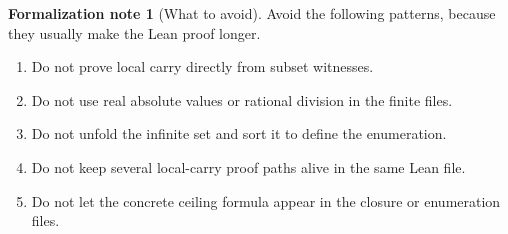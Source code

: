 \documentclass[11pt]{article}
\theoremstyle{definition}
\newtheorem{formalnote}[definition]{Formalization note}
\theoremstyle{plain}
\theoremstyle{remark}
\begin{document}
\begin{formalnote}[What to avoid]
Avoid the following patterns, because they usually make the Lean proof longer.
\begin{enumerate}[label=(\roman*), leftmargin=*]
\item Do not prove local carry directly from subset witnesses.
\item Do not use real absolute values or rational division in the finite files.
\item Do not unfold the infinite set and sort it to define the enumeration.
\item Do not keep several local-carry proof paths alive in the same Lean file.
\item Do not let the concrete ceiling formula appear in the closure or enumeration files.
\end{enumerate}
\end{formalnote}
\end{document}
